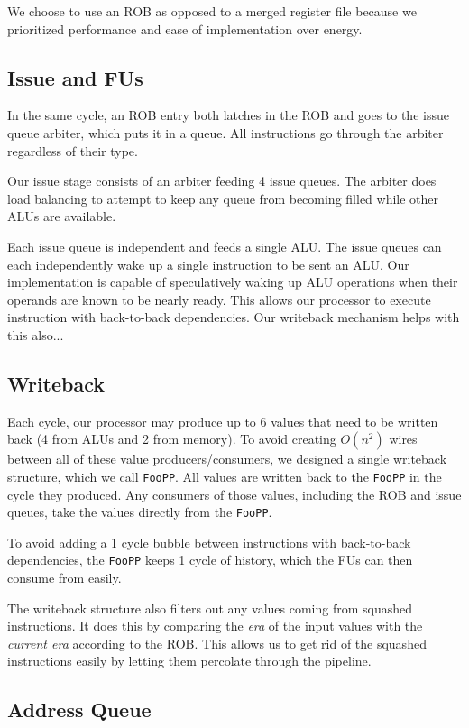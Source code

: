 \documentclass{article}
\begin{document}
We choose to use an ROB as opposed to a merged register file because we
prioritized performance and ease of implementation over energy.

\subsection{Issue and FUs}

In the same cycle, an ROB entry both latches in the ROB and goes to the issue
queue arbiter, which puts it in a queue. All instructions go through the arbiter
regardless of their type.

Our issue stage consists of an arbiter feeding 4 issue queues.
The arbiter does load balancing to attempt to keep any queue from becoming
filled while other ALUs are available.

Each issue queue is independent and feeds a single ALU. The issue queues can
each independently wake up a single instruction to be sent an ALU. Our
implementation is capable of speculatively waking up ALU operations when their
operands are known to be nearly ready. This allows our processor to execute
instruction with back-to-back dependencies. Our writeback mechanism helps with
this also...

\subsection{Writeback}

Each cycle, our processor may produce up to 6 values that need to be written
back (4 from ALUs and 2 from memory). To avoid creating $O(n^2)$ wires between
all of these value producers/consumers, we designed a single writeback
structure, which we call \texttt{FooPP}. All values are written back to the
\texttt{FooPP} in the cycle they produced. Any consumers of those values,
including the ROB and issue queues, take the values directly from the
\texttt{FooPP}.

To avoid adding a 1 cycle bubble between instructions with back-to-back
dependencies, the \texttt{FooPP} keeps 1 cycle of history, which the FUs can
then consume from easily.

The writeback structure also filters out any values coming from squashed
instructions. It does this by comparing the \emph{era} of the input values with
the \emph{current era} according to the ROB. This allows us to get rid of the
squashed instructions easily by letting them percolate through the pipeline.

\subsection{Address Queue}
\end{document}
